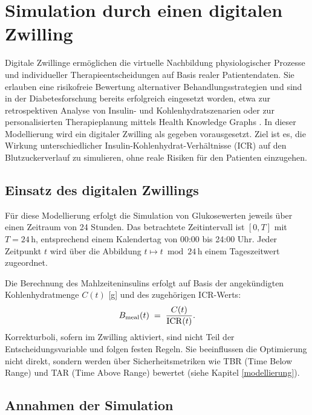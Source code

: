 \newcommand{\ubasal}{\bar u_{\mathrm{basal}}}
\newcommand{\tod}{\mathrm{tod}}
\newcommand{\Dtmin}{30\,\mathrm{min}}

\section{Simulation durch einen digitalen Zwilling} \label{simulation}

Digitale Zwillinge ermöglichen die virtuelle Nachbildung physiologischer Prozesse und individueller Therapieentscheidungen auf Basis realer Patientendaten. Sie erlauben eine risikofreie Bewertung alternativer Behandlungsstrategien und sind in der Diabetesforschung bereits erfolgreich eingesetzt worden, etwa zur retrospektiven Analyse von Insulin- und Kohlenhydratszenarien \cite{Cappon2023ReplayBG} oder zur personalisierten Therapieplanung mittels Health Knowledge Graphs \cite{jpm14040359}. In dieser Modellierung wird ein digitaler Zwilling als gegeben vorausgesetzt. Ziel ist es, die Wirkung unterschiedlicher Insulin-Kohlenhydrat-Verhältnisse (ICR) auf den Blutzuckerverlauf zu simulieren, ohne reale Risiken für den Patienten einzugehen.

\subsection{Einsatz des digitalen Zwillings}

Für diese Modellierung erfolgt die Simulation von Glukosewerten jeweils über einen Zeitraum von 24 Stunden. Das betrachtete Zeitintervall ist \([0,T]\) mit \(T=24\,\mathrm{h}\), entsprechend einem Kalendertag von 00:00 bis 24:00 Uhr. Jeder Zeitpunkt \(t\) wird über die Abbildung \(t \mapsto t \bmod 24\,\mathrm{h}\) einem Tageszeitwert zugeordnet.

Die Berechnung des Mahlzeiteninsulins erfolgt auf Basis der angekündigten Kohlenhydratmenge \(C(t)\) [g] und des zugehörigen ICR-Werts:
\[
B_{\mathrm{meal}}(t)\;=\;\frac{C(t)}{\mathrm{ICR}(t)}.
\]
Korrekturboli, sofern im Zwilling aktiviert, sind nicht Teil der Entscheidungsvariable und folgen festen Regeln. Sie beeinflussen die Optimierung nicht direkt, sondern werden über Sicherheitsmetriken wie TBR (Time Below Range) und TAR (Time Above Range) bewertet (siehe Kapitel \ref{modellierung}).

\subsection{Annahmen der Simulation}

